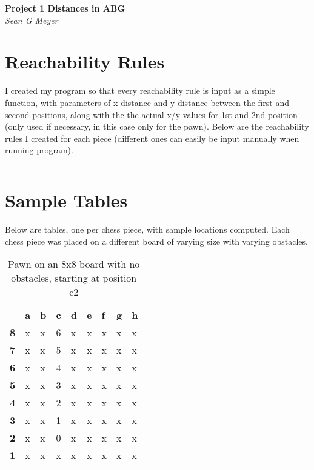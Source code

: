 \documentclass{article}
\begin{document}
\begin{center}
  \large\textbf{Project 1 \textendash{} Distances in ABG}\\
  \textit{Sean G Meyer}
\end{center}

\section*{Reachability Rules}
I created my program so that every reachability rule is input as a simple function, with parameters of x-distance and y-distance between the first and second positions, along with the the actual x/y values for 1st and 2nd position (only used if necessary, in this case only for the pawn). Below are the reachability rules I created for each piece (different ones can easily be input manually when running program).

\inputminted[breaklines,bgcolor=LightGray]{Clojure}{piece-definitions.clj}

\section*{Sample Tables}
Below are tables, one per chess piece, with sample locations computed. Each chess piece was placed on a different board of varying size with varying obstacles.

\begin{table}[H]
\centering
\caption{Pawn on an 8x8 board with no obstacles, starting at position c2}
\label{my-label}
\begin{tabular}{lllllllll}
                                & \textbf{a} & \textbf{b} & \textbf{c} & \textbf{d} & \textbf{e} & \textbf{f} & \textbf{g} & \textbf{h} \\ \cline{2-9} 
\multicolumn{1}{l|}{\textbf{8}} & x          & x          & 6          & x          & x          & x          & x          & x          \\
\multicolumn{1}{l|}{\textbf{7}} & x          & x          & 5          & x          & x          & x          & x          & x          \\
\multicolumn{1}{l|}{\textbf{6}} & x          & x          & 4          & x          & x          & x          & x          & x          \\
\multicolumn{1}{l|}{\textbf{5}} & x          & x          & 3          & x          & x          & x          & x          & x          \\
\multicolumn{1}{l|}{\textbf{4}} & x          & x          & 2          & x          & x          & x          & x          & x          \\
\multicolumn{1}{l|}{\textbf{3}} & x          & x          & 1          & x          & x          & x          & x          & x          \\
\multicolumn{1}{l|}{\textbf{2}} & x          & x          & 0          & x          & x          & x          & x          & x          \\
\multicolumn{1}{l|}{\textbf{1}} & x          & x          & x          & x          & x          & x          & x          & x         
\end{tabular}
\end{table}
\end{document}
